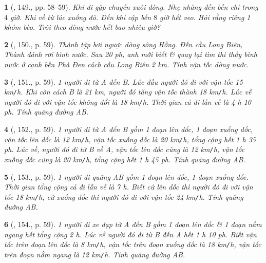\documentclass{article}
\newtheorem{baitoan}{}
\begin{document}
\begin{baitoan}[\cite{Binh_Toan_6_tap_2}, 149., pp. 58--59]
	Khi đi gặp chuyến xuôi dòng. Nhẹ nhàng đến bến chỉ trong $4$ giờ. Khi về từ lúc xuống đò. Đến khi cập bến $8$ giờ hết veo. Hỏi rằng riêng 1 khóm bèo. Trôi theo dòng nước hết bao nhiêu giờ?
\end{baitoan}

\begin{baitoan}[\cite{Binh_Toan_6_tap_2}, 150., p. 59]
	Thành tập bơi ngược dòng sông Hồng. Đến cầu Long Biên, Thành đánh rơi bình nước. Sau {\rm20 ph}, anh mới biết \& quay lại tìm thì thấy bình nước ở cạnh bến Phà Đen cách cầu Long Biên {\rm2 km}. Tính vận tốc dòng nước.
\end{baitoan}

\begin{baitoan}[\cite{Binh_Toan_6_tap_2}, 151., p. 59]
	1 người đi từ A đến B. Lúc đầu người đó đi với vận tốc {\rm15 km{\tt/}h}. Khi còn cách B là {\rm21 km}, người đó tăng vận tốc thành {\rm18 km{\tt/}h}. Lúc về người đó đi với vận tốc không đổi là {\rm18 km{\tt/}h}. Thời gian cả đi lẫn về là {\rm4 h 10 ph}. Tính quãng đường AB.
\end{baitoan}

\begin{baitoan}[\cite{Binh_Toan_6_tap_2}, 152., p. 59]
	1 người đi từ A đến B gồm 1 đoạn lên dốc, 1 đoạn xuống dốc, vận tốc lên dốc là {\rm12 km{\tt/}h}, vận tốc xuống dốc là {\rm20 km{\tt/}h}, tổng cộng hết {\rm1 h 35 ph}. Lúc về, người đó đi từ B về A, vận tốc lên dốc cũng là {\rm12 km{\tt/}h}, vận tốc xuống dốc cũng là {\rm20 km{\tt/}h}, tổng cộng hết {\rm1 h 45 ph}. Tính quãng đường AB.
\end{baitoan}

\begin{baitoan}[\cite{Binh_Toan_6_tap_2}, 153., p. 59]
	1 người đi quãng AB gồm 1 đoạn lên dốc, 1 đoạn xuống dốc. Thời gian tổng cộng cả đi lẫn về là {\rm7 h}. Biết cứ lên dốc thì người đó đi với vận tốc {\rm18 km{\tt/}h}, cứ xuống dốc thì người đó đi với vận tốc {\rm24 km{\tt/}h}. Tính quãng đường AB.
\end{baitoan}

\begin{baitoan}[\cite{Binh_Toan_6_tap_2}, 154., p. 59]
	1 người đi xe đạp từ A đến B gồm 1 đoạn lên dốc \& 1 đoạn nằm ngang hết tổng cộng {\rm2 h}. Lúc về người đó đi từ B đến A hết {\rm1 h 10 ph}. Biết vận tốc trên đoạn lên dốc là {\rm8 km{\tt/}h}, vận tốc trên đoạn xuống dốc là {\rm18 km{\tt/}h}, vận tốc trên đoạn nằm ngang là {\rm12 km{\tt/}h}. Tính quãng đường AB.
\end{baitoan}
\end{document}
